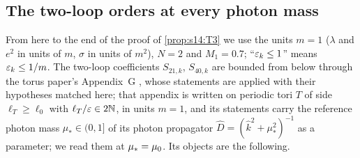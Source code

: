 
\subsection*{The two-loop orders at every photon mass}

From here to the end of the proof of \cref{prop:s14:T3} we use the units $m=1$ ($\lambda$ and $e^2$ in units of $m$, $\sigma$ in units of $m^2$), $N=2$ and $M_1=0.7$; ``$\varepsilon_k\le1$'' means $\varepsilon_k\le1/m$. The two-loop coefficients $S_{21,k}$, $S_{40,k}$ are bounded from below through the torus paper's Appendix~G \cite{SymPhase}, whose statements are applied with their hypotheses matched here; that appendix is written on periodic tori $T$ of side $\ell_T\ge\ell_0$ with $\ell_T/\varepsilon\in2\mathbb N$, in units $m=1$, and its statements carry the reference photon mass $\mu_*\in(0,1]$ of its photon propagator $\hat D=(\hat k^2+\mu_*^2)^{-1}$ as a parameter; we read them at $\mu_*=\mu_0$. Its objects are the following.

